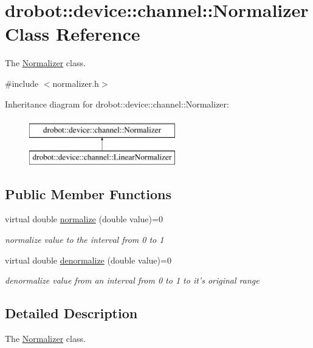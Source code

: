 \hypertarget{classdrobot_1_1device_1_1channel_1_1Normalizer}{\section{drobot\-:\-:device\-:\-:channel\-:\-:Normalizer Class Reference}
\label{classdrobot_1_1device_1_1channel_1_1Normalizer}
}


The \hyperlink{classdrobot_1_1device_1_1channel_1_1Normalizer}{Normalizer} class.  




{\ttfamily \#include $<$normalizer.\-h$>$}

Inheritance diagram for drobot\-:\-:device\-:\-:channel\-:\-:Normalizer\-:\begin{figure}[H]
\begin{center}
\leavevmode
\includegraphics[height=2.000000cm]{classdrobot_1_1device_1_1channel_1_1Normalizer}
\end{center}
\end{figure}
\subsection*{Public Member Functions}
\begin{DoxyCompactItemize}
\item 
virtual double \hyperlink{classdrobot_1_1device_1_1channel_1_1Normalizer_a815d0fa0ae0f301137b7a79baff020f2}{normalize} (double value)=0
\begin{DoxyCompactList}\small\item\em normalize value to the interval from 0 to 1 \end{DoxyCompactList}\item 
virtual double \hyperlink{classdrobot_1_1device_1_1channel_1_1Normalizer_ab95ae6d2d813c70bd99efb998b78d163}{denormalize} (double value)=0
\begin{DoxyCompactList}\small\item\em denormalize value from an interval from 0 to 1 to it's original range \end{DoxyCompactList}\end{DoxyCompactItemize}


\subsection{Detailed Description}
The \hyperlink{classdrobot_1_1device_1_1channel_1_1Normalizer}{Normalizer} class. 

